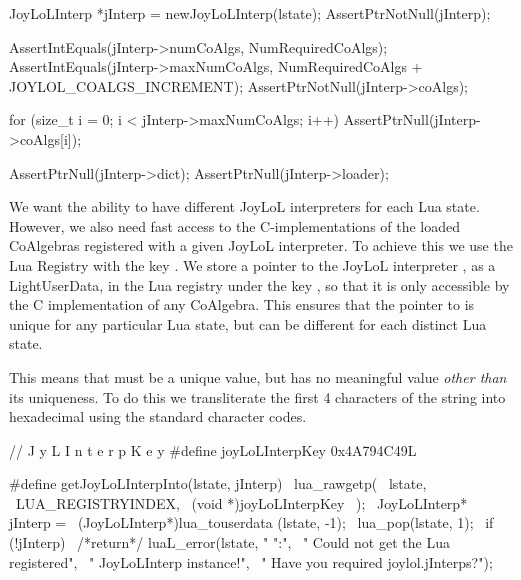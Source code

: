
\startCTest
  JoyLoLInterp *jInterp = newJoyLoLInterp(lstate);
  AssertPtrNotNull(jInterp);
  
  AssertIntEquals(jInterp->numCoAlgs,
    NumRequiredCoAlgs);
  AssertIntEquals(jInterp->maxNumCoAlgs,
    NumRequiredCoAlgs + JOYLOL_COALGS_INCREMENT);
  AssertPtrNotNull(jInterp->coAlgs);
  
  for (size_t i = 0; i < jInterp->maxNumCoAlgs; i++) {
    AssertPtrNull(jInterp->coAlgs[i]);
  }
  
  AssertPtrNull(jInterp->dict);
  AssertPtrNull(jInterp->loader);
\stopCTest
\stopTestCase
\stopTestSuite


We want the ability to have different JoyLoL interpreters for each Lua 
state. However, we also need fast access to the C-implementations of the 
loaded CoAlgebras registered with a given JoyLoL interpreter. To achieve 
this we use the Lua Registry with the  key 
. We store a pointer to the JoyLoL interpreter 
, as a LightUserData, in the Lua registry under the key 
, so that it is only accessible by the C 
implementation of any CoAlgebra. This ensures that the pointer to 
 is unique for any particular Lua state, but can be 
different for each distinct Lua state. 

This means that  must be a unique value, but has no 
meaningful value \emph{other than} its uniqueness. To do this we 
transliterate the first 4 characters of the string  
into hexadecimal using the standard  character codes. 

\startCHeader
//                         J y L I n t e r p K e y
#define joyLoLInterpKey 0x4A794C49L

#define getJoyLoLInterpInto(lstate, jInterp)      \
  lua_rawgetp(                                    \
    lstate,                                       \
    LUA_REGISTRYINDEX,                            \
    (void *)joyLoLInterpKey                       \
  );                                              \
  JoyLoLInterp* jInterp =                         \
    (JoyLoLInterp*)lua_touserdata (lstate, -1);   \
  lua_pop(lstate, 1);                             \
  if (!jInterp) {                                 \
    /*return*/ luaL_error(lstate, "%
      "\nERROR:\n",                               \
      "  Could not get the Lua registered\n",     \
      "  JoyLoLInterp instance!\n",               \
      "  Have you required joylol.jInterps?\n");  \
  }
\stopCHeader

